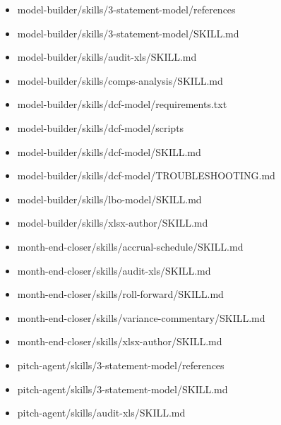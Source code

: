 \documentclass[11pt]{article}
\begin{document}
\begin{itemize}[leftmargin=*,itemsep=1pt,topsep=2pt]
\item \hspace*{2.7em}model-builder/skills/3-statement-model/references
\item \hspace*{2.7em}model-builder/skills/3-statement-model/SKILL.md
\item \hspace*{2.7em}model-builder/skills/audit-xls/SKILL.md
\item \hspace*{2.7em}model-builder/skills/comps-analysis/SKILL.md
\item \hspace*{2.7em}model-builder/skills/dcf-model/requirements.txt
\item \hspace*{2.7em}model-builder/skills/dcf-model/scripts
\item \hspace*{2.7em}model-builder/skills/dcf-model/SKILL.md
\item \hspace*{2.7em}model-builder/skills/dcf-model/TROUBLESHOOTING.md
\item \hspace*{2.7em}model-builder/skills/lbo-model/SKILL.md
\item \hspace*{2.7em}model-builder/skills/xlsx-author/SKILL.md
\item \hspace*{2.7em}month-end-closer/skills/accrual-schedule/SKILL.md
\item \hspace*{2.7em}month-end-closer/skills/audit-xls/SKILL.md
\item \hspace*{2.7em}month-end-closer/skills/roll-forward/SKILL.md
\item \hspace*{2.7em}month-end-closer/skills/variance-commentary/SKILL.md
\item \hspace*{2.7em}month-end-closer/skills/xlsx-author/SKILL.md
\item \hspace*{2.7em}pitch-agent/skills/3-statement-model/references
\item \hspace*{2.7em}pitch-agent/skills/3-statement-model/SKILL.md
\item \hspace*{2.7em}pitch-agent/skills/audit-xls/SKILL.md

\end{itemize}
\end{document}
